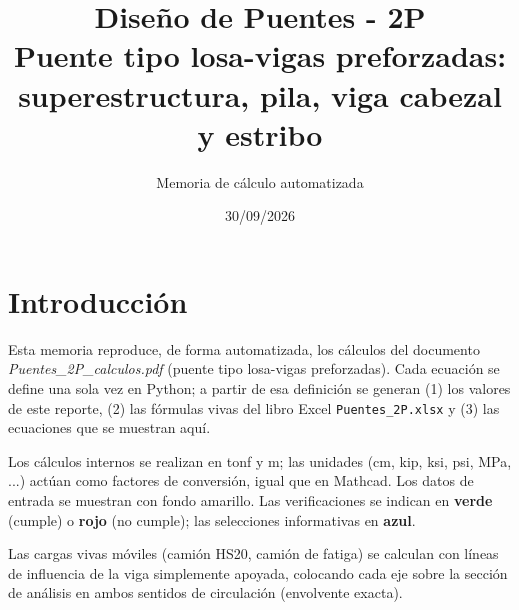 \documentclass[10pt,a4paper]{article}
\title{\color{azul}\textbf{Diseño de Puentes - 2P}\\[4pt]\large Puente tipo losa-vigas preforzadas: superestructura, pila, viga cabezal y estribo}
\author{Memoria de cálculo automatizada}
\date{30/09/2026}
\newcommand{\ok}[1]{\textcolor{verde}{\textbf{#1}}}
\newcommand{\nook}[1]{\textcolor{rojo}{\textbf{#1}}}
\newcommand{\info}[1]{\textcolor{azul}{\textbf{#1}}}
\begin{document}
\maketitle
\tableofcontents
\clearpage
\section*{Introducción}
Esta memoria reproduce, de forma automatizada, los cálculos del documento \emph{Puentes\_2P\_calculos.pdf} (puente tipo losa-vigas preforzadas). Cada ecuación se define una sola vez en Python; a partir de esa definición se generan (1) los valores de este reporte, (2) las fórmulas vivas del libro Excel \texttt{Puentes\_2P.xlsx} y (3) las ecuaciones que se muestran aquí.

Los cálculos internos se realizan en tonf y m; las unidades (cm, kip, ksi, psi, MPa, ...) actúan como factores de conversión, igual que en Mathcad. Los datos de entrada se muestran con fondo amarillo. Las verificaciones se indican en \ok{verde} (cumple) o \nook{rojo} (no cumple); las selecciones informativas en \info{azul}.

Las cargas vivas móviles (camión HS20, camión de fatiga) se calculan con líneas de influencia de la viga simplemente apoyada, colocando cada eje sobre la sección de análisis en ambos sentidos de circulación (envolvente exacta).
\clearpage
\end{document}
